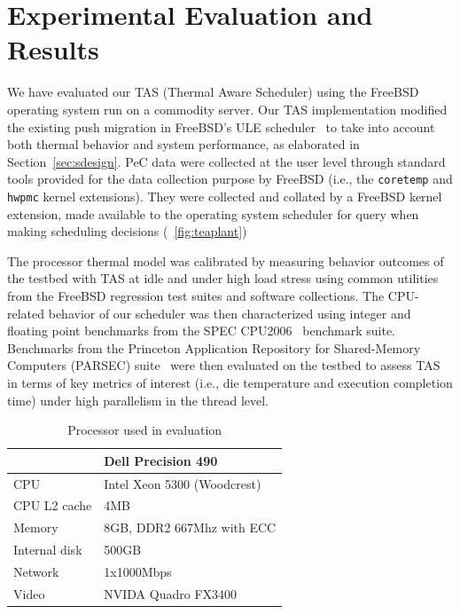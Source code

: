 \documentclass[times, 10pt,twocolumn]{IEEEtran}
\begin{document}
\section{Experimental Evaluation and Results}
\label{sec:experiment} 
We have evaluated our TAS (Thermal Aware Scheduler) using the FreeBSD
operating system run on a commodity server.  Our TAS implementation
modified the existing push migration in FreeBSD's ULE
scheduler~\cite{Roberson2003} to take into account both thermal behavior
and system performance, as elaborated in Section~\ref{sec:sdesign}.  PeC
data were collected at the user level through standard tools provided
for the data collection purpose by FreeBSD (i.e., the \texttt{coretemp}
and \texttt{hwpmc} kernel extensions).  They were collected and collated
by a FreeBSD kernel extension, made available to the operating system
scheduler for query when making scheduling decisions
(\figurename~\ref{fig:teaplant})

The processor thermal model was calibrated by measuring behavior
outcomes of the testbed with TAS at idle and under high load stress
using common utilities from the FreeBSD regression test suites and
software collections.  The CPU-related behavior of our scheduler was
then characterized using integer and floating point benchmarks from the
SPEC CPU2006~\cite{Henning2006} benchmark suite.  Benchmarks from the
Princeton Application Repository for Shared-Memory Computers (PARSEC)
suite~\cite{Bienia2008} were then evaluated on the testbed to assess TAS
in terms of key metrics of interest (i.e., die temperature and execution
completion time) under high parallelism in the thread level.

\begin{small}
\begin{table}[tbhp] 
\centering
  \caption{Processor used in evaluation}
  \label{tab:hardware}
  \begin{tabular}{l l} 
\hline 
\hline
&\textbf{Dell Precision 490}\\ 
\hline 
CPU&Intel Xeon 5300 (Woodcrest)\\ 
CPU L2 cache&4MB\\ 
Memory&8GB, DDR2 667Mhz with ECC\\
Internal disk&500GB\\ 
Network&1x1000Mbps\\ 
Video&NVIDA Quadro FX3400\\ 
\hline
  \end{tabular}
\end{table}
\end{small}
\end{document}

